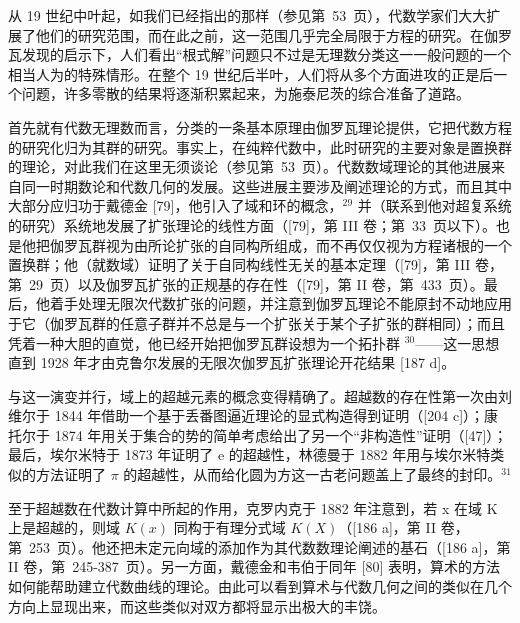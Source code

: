 从 19 世纪中叶起，如我们已经指出的那样（参见第~53~页），代数学家们大大扩展了他们的研究范围，而在此之前，这一范围几乎完全局限于方程的研究。在伽罗瓦发现的启示下，人们看出“根式解”问题只不过是无理数分类这一一般问题的一个相当人为的特殊情形。在整个 19 世纪后半叶，人们将从多个方面进攻的正是后一个问题，许多零散的结果将逐渐积累起来，为施泰尼茨的综合准备了道路。

首先就有代数无理数而言，分类的一条基本原理由伽罗瓦理论提供，它把代数方程的研究化归为其群的研究。事实上，在纯粹代数中，此时研究的主要对象是置换群的理论，对此我们在这里无须谈论（参见第~53~页）。代数数域理论的其他进展来自同一时期数论和代数几何的发展。这些进展主要涉及阐述理论的方式，而且其中大部分应归功于戴德金 {[}79{]}，他引入了域和环的概念，\(^{29}\) 并（联系到他对超复系统的研究）系统地发展了扩张理论的线性方面（{[}79{]}，第 III 卷；第~33~页以下）。也是他把伽罗瓦群视为由所论扩张的自同构所组成，而不再仅仅视为方程诸根的一个置换群；他（就数域）证明了关于自同构线性无关的基本定理（{[}79{]}，第 III 卷，第~29~页）以及伽罗瓦扩张的正规基的存在性（{[}79{]}，第 II 卷，第~433~页）。最后，他着手处理无限次代数扩张的问题，并注意到伽罗瓦理论不能原封不动地应用于它（伽罗瓦群的任意子群并不总是与一个扩张关于某个子扩张的群相同）；而且凭着一种大胆的直觉，他已经开始把伽罗瓦群设想为一个拓扑群 \(^{30}\)——这一思想直到 1928 年才由克鲁尔发展的无限次伽罗瓦扩张理论开花结果 {[}187 d{]}。

与这一演变并行，域上的超越元素的概念变得精确了。超越数的存在性第一次由刘维尔于 1844 年借助一个基于丢番图逼近理论的显式构造得到证明（{[}204 c{]}）；康托尔于 1874 年用关于集合的势的简单考虑给出了另一个“非构造性”证明（{[}47{]}）；最后，埃尔米特于 1873 年证明了 e 的超越性，林德曼于 1882 年用与埃尔米特类似的方法证明了 \(\pi\) 的超越性，从而给化圆为方这一古老问题盖上了最终的封印。\(^{31}\)

至于超越数在代数计算中所起的作用，克罗内克于 1882 年注意到，若 x 在域 K 上是超越的，则域 \(K(x)\) 同构于有理分式域 \(K(X)\)（{[}186 a{]}，第 II 卷，第~253~页）。他还把未定元向域的添加作为其代数数理论阐述的基石（{[}186 a{]}，第 II 卷，第~245-387~页）。另一方面，戴德金和韦伯于同年 {[}80{]} 表明，算术的方法如何能帮助建立代数曲线的理论。由此可以看到算术与代数几何之间的类似在几个方向上显现出来，而这些类似对双方都将显示出极大的丰饶。

